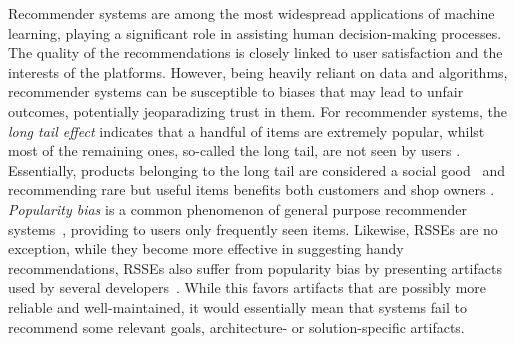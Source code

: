 Recommender systems are among the most widespread applications of machine learning, playing a significant role in assisting human decision-making processes. The quality of the recommendations %
is closely linked to user satisfaction and the interests of the platforms. However, being heavily reliant on data and algorithms, recommender systems can be susceptible to biases that may lead to unfair outcomes, potentially jeoparadizing trust in them. %
For recommender systems, %
the \emph{long tail effect} indicates that a handful of items are extremely popular, whilst most of the remaining ones, so-called the long tail, are not seen by users \cite{Anderson:2006:LTW:1197299}. Essentially, products belonging to the long tail are considered a social good~\cite{DBLP:conf/recsys/AbdollahpouriMB19} and recommending rare but useful items benefits both customers and shop owners \cite{Vargas_sales_diversity_14}. 
\emph{Popularity bias} is a common phenomenon of general purpose recommender systems~\cite{DBLP:conf/flairs/AbdollahpouriBM19,DBLP:conf/recsys/AbdollahpouriMB19,10.1145/3564284}, \ie providing to users only frequently seen items. Likewise, RSSEs are no exception, while they become more effective in suggesting handy recommendations, RSSEs also suffer from popularity bias by presenting artifacts %
used by several developers~\cite{10174041}. While this favors artifacts that are possibly more reliable and well-maintained, it would essentially mean that systems fail to recommend some relevant goals, architecture- or solution-specific artifacts. %





